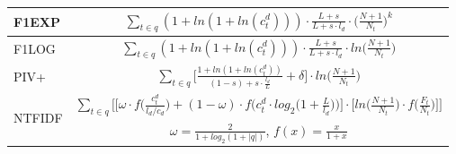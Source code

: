 \begin{table}[t]
\begin{tabular}{ |l|c| }
    F1EXP & $
    \sum_{t \in q}{(1+ln(1+ln(c_{t}^{d})))\cdot \frac{L+s}{L+s\cdot l_{d}} \cdot \Big(\frac{N+1}{N_t}\Big)^k}
    $ \\ \hline

    F1LOG & $
    \sum_{t \in q}{(1+ln(1+ln(c_{t}^{d})))\cdot \frac{L+s}{L+s\cdot l_{d}} \cdot ln\Big(\frac{N+1}{N_t}\Big)}
    $ \\ \hline

    PIV+ & $
    \sum_{t \in q}{\Big[\frac{1+ln(1+ln(c_{t}^{d}))}{(1-s)+s\cdot \frac{l_{d}}{L}} + \delta \Big] \cdot ln \Big(\frac{N+1}{N_{t}}\Big)}
    $ \\ \hline

    \multirow{2}{*}{NTFIDF} & $
    \sum_{t \in q} \Bigg[\Big[\omega \cdot f\Big(\frac{c_{t}^{d}}{l_{d}/c_d}\Big) + (1-\omega)\cdot f\Big(c_{t}^{d}\cdot log_2\Big(1+\frac{L}{l_{d}}\Big)\Big)\Big] \cdot \Big[ln\Big(\frac{N+1}{N_t}\Big) \cdot f\Big(\frac{F_t}{N_t}\Big)\Big]\Bigg]$ \\ 
    & $\omega=\frac{2}{1+log_2(1+|q|)}$, $f(x)=\frac{x}{1+x}$ \\ \hline
         \hline
    \end{tabular} 
    \end{table}

